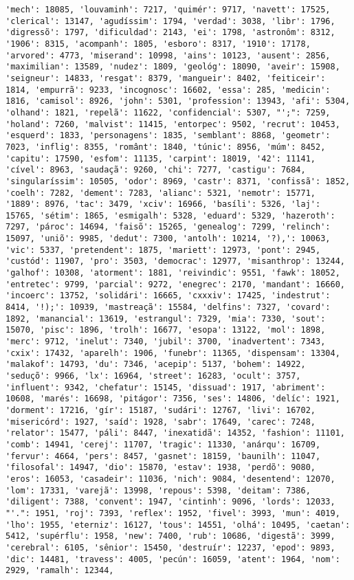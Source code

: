\documentclass[11pt]{article}
\begin{document}
\begin{Verbatim}[commandchars=\\\{\}]
'mech': 18085, 'louvaminh': 7217, 'quimér': 9717, 'navett': 17525, 'clerical': 13147, 'agudíssim': 1794, 'verdad': 3038, 'libr': 1796, 'digressõ': 1797, 'dificuldad': 2143, 'ei': 1798, 'astronôm': 8312, '1906': 8315, 'acompanh': 1805, 'esboro': 8317, '1910': 17178, 'arvored': 4773, 'miserand': 10998, 'ains': 10123, 'ausent': 2856, 'maximilian': 13589, 'nudez': 1809, 'geológ': 18090, 'aveir': 15908, 'seigneur': 14833, 'resgat': 8379, 'mangueir': 8402, 'feiticeir': 1814, 'empurrã': 9233, 'incognosc': 16602, 'essa': 285, 'medicin': 1816, 'camisol': 8926, 'john': 5301, 'profession': 13943, 'afi': 5304, 'olhand': 1821, 'repelã': 11622, 'confidencial': 5307, "';": 7259, 'holand': 7260, 'malvist': 11415, 'entorpec': 9502, 'recrut': 10453, 'esquerd': 1833, 'personagens': 1835, 'semblant': 8868, 'geometr': 7023, 'inflig': 8355, 'românt': 1840, 'túnic': 8956, 'múm': 8452, 'capitu': 17590, 'esfom': 11135, 'carpint': 18019, '42': 11141, 'cível': 8963, 'saudaçã': 9260, 'chi': 7277, 'castigu': 7684, 'singularíssim': 10505, 'odor': 8969, 'castr': 8371, 'confissã': 1852, 'coelh': 7282, 'dement': 7283, 'alianc': 5321, 'nemotr': 15771, '1889': 8976, 'tac': 3479, 'xciv': 16966, 'basíli': 5326, 'laj': 15765, 'sétim': 1865, 'esmigalh': 5328, 'eduard': 5329, 'hazeroth': 7297, 'pároc': 14694, 'faisõ': 15265, 'genealog': 7299, 'relinch': 15097, 'uniõ': 9985, 'dedut': 7300, 'antolh': 10214, '?),': 10063, 'vic': 5337, 'pretendent': 1875, 'mariett': 12973, 'pont': 2945, 'custód': 11907, 'pro': 3503, 'democrac': 12977, 'misanthrop': 13244, 'galhof': 10308, 'atorment': 1881, 'reivindic': 9551, 'fawk': 18052, 'entretec': 9799, 'parcial': 9272, 'enegrec': 2170, 'mandant': 16660, 'incoerc': 13752, 'solidári': 16665, 'cxxxiv': 17425, 'indestrut': 8414, '!);': 10939, 'mastreaçã': 15584, 'delfins': 7327, 'covard': 1892, 'manancial': 13619, 'estrangul': 7329, 'mia': 7330, 'sout': 15070, 'pisc': 1896, 'trolh': 16677, 'esopa': 13122, 'mol': 1898, 'merc': 9712, 'inelut': 7340, 'jubil': 3700, 'inadvertent': 7343, 'cxix': 17432, 'aparelh': 1906, 'funebr': 11365, 'dispensam': 13304, 'malakof': 14793, 'du': 7346, 'acepip': 5137, 'bohem': 14922, 'seduçõ': 9966, 'lx': 16964, 'street': 16283, 'ocult': 3757, 'influent': 9342, 'chefatur': 15145, 'dissuad': 1917, 'abriment': 10608, 'marés': 16698, 'pitágor': 7356, 'ses': 14806, 'delíc': 1921, 'dorment': 17216, 'gír': 15187, 'sudári': 12767, 'livi': 16702, 'misericórd': 1927, 'saíd': 1928, 'sabr': 17649, 'carec': 7248, 'relator': 15477, 'páli': 8447, 'inexatidã': 14352, 'fashion': 11101, 'comb': 14941, 'cerej': 11707, 'tragic': 11330, 'anárqu': 16709, 'fervur': 4664, 'pers': 8457, 'gasnet': 18159, 'baunilh': 11047, 'filosofal': 14947, 'dio': 15870, 'estav': 1938, 'perdõ': 9080, 'eros': 16053, 'casadeir': 11036, 'nich': 9084, 'desentend': 12070, 'lom': 17331, 'varejã': 13998, 'repous': 5398, 'deitam': 7386, 'diligent': 7388, 'convent': 1947, 'cintinh': 9096, 'lords': 12033, "'.": 1951, 'roj': 7393, 'reflex': 1952, 'fivel': 3993, 'mun': 4019, 'lho': 1955, 'eterniz': 16127, 'tous': 14551, 'olhá': 10495, 'caetan': 5412, 'supérflu': 1958, 'new': 7400, 'rub': 10686, 'digestã': 3999, 'cerebral': 6105, 'sênior': 15450, 'destruír': 12237, 'epod': 9893, 'dic': 14481, 'travess': 4005, 'pecún': 16059, 'atent': 1964, 'nom': 2929, 'ramalh': 12344, 
\end{Verbatim}
\end{document}
